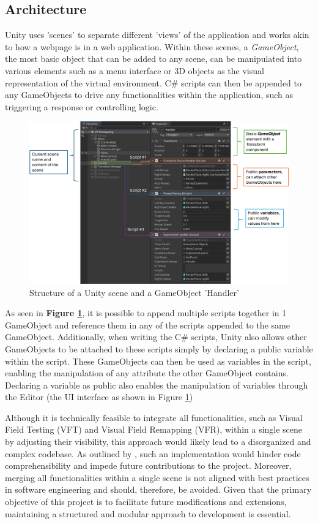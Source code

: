 \documentclass{l4proj}
\begin{document}
\subsection{Architecture}
Unity uses 'scenes' to separate different 'views' of the application and works akin to how a webpage is in a web application. Within these scenes, a \textit{GameObject}, the most basic object that can be added to any scene, can be manipulated into various elements such as a menu interface or 3D objects as the visual representation of the virtual environment. C\# scripts can then be appended to any GameObjects to drive any functionalities within the application, such as triggering a response or controlling logic.

\begin{figure}[!h]
    \centering
    \includegraphics[width=1\linewidth]{images/UnityStructure.png}
    \caption{Structure of a Unity scene and a GameObject 'Handler'}
    \label{fig:Unity-Structure}
\end{figure}

As seen in \textbf{Figure \ref{fig:Unity-Structure}}, it is possible to append multiple scripts together in 1 GameObject and reference them in any of the scripts appended to the same GameObject. Additionally, when writing the C\# scripts, Unity also allows other GameObjects to be attached to these scripts simply by declaring a public variable within the script. These GameObjects can then be used as variables in the script, enabling the manipulation of any attribute the other GameObject contains. Declaring a variable as public also enables the manipulation of variables through the Editor (the UI interface as shown in Figure \ref{fig:Unity-Structure})

Although it is technically feasible to integrate all functionalities, such as Visual Field Testing (VFT) and Visual Field Remapping (VFR), within a single scene by adjusting their visibility, this approach would likely lead to a disorganized and complex codebase. As outlined by \cite{Sun2015ModularitysCompany}, such an implementation would hinder code comprehensibility and impede future contributions to the project. Moreover, merging all functionalities within a single scene is not aligned with best practices in software engineering and should, therefore, be avoided. Given that the primary objective of this project is to facilitate future modifications and extensions, maintaining a structured and modular approach to development is essential.
\end{document}
